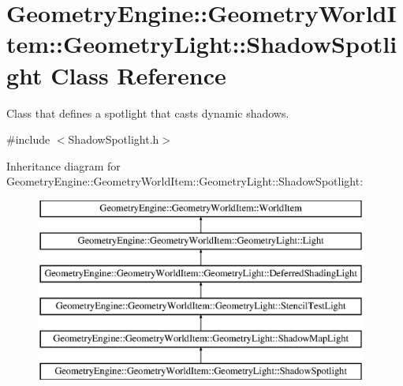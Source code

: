 \hypertarget{class_geometry_engine_1_1_geometry_world_item_1_1_geometry_light_1_1_shadow_spotlight}{}\section{Geometry\+Engine\+::Geometry\+World\+Item\+::Geometry\+Light\+::Shadow\+Spotlight Class Reference}
\label{class_geometry_engine_1_1_geometry_world_item_1_1_geometry_light_1_1_shadow_spotlight}


Class that defines a spotlight that casts dynamic shadows.  




{\ttfamily \#include $<$Shadow\+Spotlight.\+h$>$}

Inheritance diagram for Geometry\+Engine\+::Geometry\+World\+Item\+::Geometry\+Light\+::Shadow\+Spotlight\+:\begin{figure}[H]
\begin{center}
\leavevmode
\includegraphics[height=6.000000cm]{class_geometry_engine_1_1_geometry_world_item_1_1_geometry_light_1_1_shadow_spotlight}
\end{center}
\end{figure}
